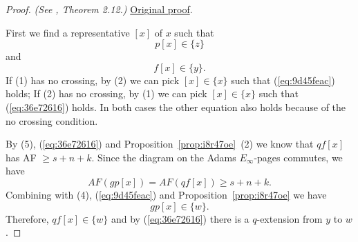 \begin{proof}
\textit{(See \cite{LWX126}, Theorem 2.12.)} \href{paper/main.tex.html#L483}{Original proof}.

First we find a representative $[x]$ of $x$ such that
    \begin{equation}\label{eq:9d45feac}
        p[x]\in \{z\}
    \end{equation}
    and
    \begin{equation}\label{eq:36e72616}
        f[x]\in \{y\}.
    \end{equation}
    If (1) has no crossing, by (2) we can pick $[x]\in \{x\}$ such that (\ref{eq:9d45feac}) holds;
    If (2) has no crossing, by (1) we can pick $[x]\in \{x\}$ such that  (\ref{eq:36e72616}) holds.
    In both cases the other equation also holds because of the no crossing condition.

    By (5), (\ref{eq:36e72616}) and Proposition~\ref{prop:i8r47oe}~(2) we know that $qf[x]$ has AF $\ge s+n+k$. Since the diagram on the Adams $E_\infty$-pages commutes, we have
    $$AF(gp[x])=AF(qf[x])\ge s+n+k.$$
    Combining with (4), (\ref{eq:9d45feac}) and Proposition~\ref{prop:i8r47oe} we have
    $$gp[x]\in \{w\}.$$
    Therefore, $qf[x]\in \{w\}$ and by (\ref{eq:36e72616}) there is a $q$-extension from $y$ to $w$.
\end{proof}

